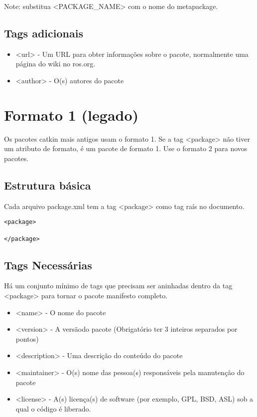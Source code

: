 Note: substitua <PACKAGE\_NAME> com o nome do metapackage.

\subsection{Tags adicionais}

\begin{itemize}
	\setlength{\itemsep}{1pt}
	\setlength{\parskip}{0pt}
	\setlength{\parsep}{0pt}
	\item [] <url> - 
	Um URL para obter informações sobre o pacote, normalmente uma página do wiki no ros.org.
	\item [] <author> - O(s) autores do pacote
\end{itemize}

\section{Formato 1 (legado)}

Os pacotes catkin mais antigos usam o formato 1. Se a tag <package> não tiver um atributo de formato, é um pacote de formato 1. Use o formato 2 para novos pacotes.

\subsection{Estrutura básica}

Cada arquivo package.xml tem a tag <package> como tag raís no documento.

\begin{verbatim}
<package>

</package>
\end{verbatim}

\subsection{Tags Necessárias}

Há um conjunto mínimo de tags que precisam ser aninhadas dentro da tag <package> para tornar o pacote manifesto completo.

\begin{itemize}
	\setlength{\itemsep}{1pt}
	\setlength{\parskip}{0pt}
	\setlength{\parsep}{0pt}
	\item [] <name> - O nome do pacote
	\item []<version> - A versãodo pacote (Obrigatório ter 3 inteiros separados por pontos)
	\item []<description> - Uma descrição do conteúdo do pacote
	\item []<maintainer> - O(s) nome das pessoa(s) responsáveis pela manutenção do pacote
	\item []<license> - A(s) licença(s) de software (por exemplo, GPL, BSD, ASL) sob a qual o código é liberado.
\end{itemize}


